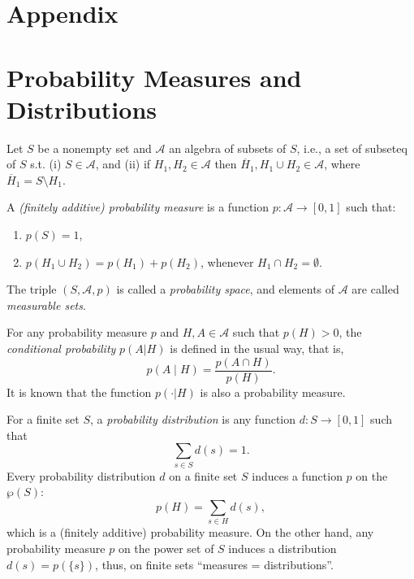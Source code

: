 \section*{Appendix}
\appendix

\section{Probability Measures and Distributions}



Let $S$ be a nonempty set and $\mathcal{A}$ an algebra of subsets of $S$, 
i.e., a set of subseteq of $S$ s.t. (i) $S \in \mathcal{A}$, 
and (ii) if $H_1,H_2 \in \mathcal{A}$ then $\overline{H}_1, H_1 \cup H_2 \in \mathcal{A}$, 
where $\overline{H}_1=S\setminus H_1$.



A \textit{(finitely additive) probability measure} is a function $p \colon \mathcal{A} \to [0,1]$ such that:
\begin{enumerate}[itemsep=5pt,parsep=5pt,leftmargin=3em,topsep=5pt,label=(\arabic*)] %
    \item $p(S)=1$,
    
    \item $p(H_1 \cup H_2) = p(H_1)+p(H_2)$, 
    whenever $H_1 \cap H_2 = \emptyset$.
\end{enumerate}


The triple $(S,\mathcal{A},p)$ is called a \textit{probability space}, 
and elements of $\mathcal{A}$ are called \textit{measurable sets}.



For any probability measure $p$ and $H,A \in \mathcal{A}$ such that $p(H)>0$, 
the \textit{conditional probability} $p(A | H)$ is defined in the usual way, that is, 
\[
    p(A \mid H) = 
    \dfrac{p(A \cap H)}{p(H)}. 
\]
It is known that the function $p(\cdot | H)$ is also a probability measure.





For a finite set $S$, 
a \textit{probability distribution} is any  function $d\colon S \to [0,1]$ such that 
\[
    \sum_{s \in S} d(s) = 1.
\]
Every probability distribution $d$ on a finite set $S$ induces a function $p$ on the $\wp(S)$:
\[
    p(H) = \sum_{s \in H} d(s),
\]
which is a (finitely additive) probability measure. 
% 
On the other hand,
any probability measure $p$ on the power set of $S$ induces a distribution $d(s)=p(\{s\})$, 
thus, 
on finite sets ``measures = distributions''.



    
